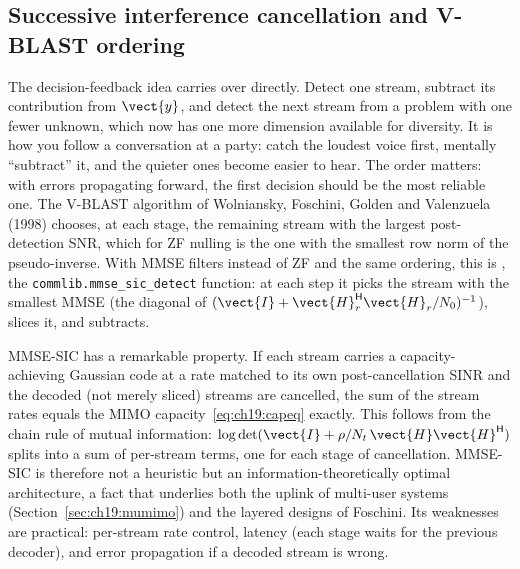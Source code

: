 
\subsection{Successive interference cancellation and V-BLAST ordering}

The decision-feedback idea carries over directly. Detect one stream, subtract its contribution
from $\vect{y}$, and detect the next stream from a problem with one fewer unknown, which now has
one more dimension available for diversity. It is how you follow a conversation at a party: catch
the loudest voice first, mentally ``subtract'' it, and the quieter ones become easier to hear. The
order matters: with errors propagating forward, the first decision should be the most reliable one.
The V-BLAST algorithm of Wolniansky, Foschini, Golden and Valenzuela (1998) chooses, at each stage,
the remaining stream with the largest post-detection SNR, which for ZF nulling is the one with the
smallest row norm of the pseudo-inverse. With MMSE filters instead of ZF and the same ordering, this
is , the \texttt{commlib.mmse\_sic\_detect} function: at each step it picks the stream
with the smallest MMSE (the diagonal of $(\vect{I}+\vect{H}_r^{\mathsf H}\vect{H}_r/N_0)^{-1}$),
slices it, and subtracts.

MMSE-SIC has a remarkable property. If each stream carries a capacity-achieving Gaussian code at a
rate matched to its own post-cancellation SINR and the decoded (not merely sliced) streams are
cancelled, the sum of the stream rates equals the MIMO capacity~\eqref{eq:ch19:capeq} exactly. This
follows from the chain rule of mutual information: $\log\det(\vect{I}+\rho/N_t\,\vect{H}\vect{H}^{\mathsf H})$
splits into a sum of per-stream terms, one for each stage of cancellation. MMSE-SIC is therefore
not a heuristic but an information-theoretically optimal architecture, a fact that underlies both
the uplink of multi-user systems (Section~\ref{sec:ch19:mumimo}) and the layered designs of
Foschini. Its weaknesses are practical: per-stream rate control, latency (each stage waits for the
previous decoder), and error propagation if a decoded stream is wrong.

